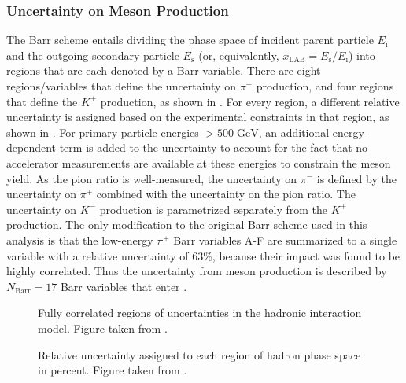 \subsubsection{Uncertainty on Meson Production}
The Barr scheme entails dividing the phase space of incident parent particle $E_\mathrm{i}$ and the outgoing secondary particle $E_\mathrm{s}$ (or, equivalently, $x_{\mathrm{LAB}}=E_\mathrm{s}/E_\mathrm{i}$) into regions that are each denoted by a Barr variable.
There are eight regions/variables that define the uncertainty on $ \pi^+ $ production, and four regions that define the $K^+$ production, as shown in .
For every region, a different relative uncertainty is assigned based on the experimental constraints in that region, as shown in .
For primary particle energies $>500\;\mathrm{GeV}$, an additional energy-dependent term is added to the uncertainty to account for the fact that no accelerator measurements are available at these energies to constrain the meson yield.
As the pion ratio is well-measured, the uncertainty on $ \pi^- $ is defined by the uncertainty on $ \pi^+ $ combined with the uncertainty on the pion ratio.
The uncertainty on $ K^- $ production is parametrized separately from the $K^+$ production.
The only modification to the original Barr scheme used in this analysis is that the low-energy $ \pi^+ $ Barr variables A-F are summarized to a single variable with a relative uncertainty of 63\%, because their impact was found to be highly correlated.
Thus the uncertainty from meson production is described by $N_\mathrm{Barr}=17$ Barr variables that enter .

\begin{figure}
    \centering
    
    \caption{Fully correlated regions of uncertainties in the hadronic interaction model. Figure taken from \cite{Barr2006}.}
\end{figure}
\begin{figure}
    \centering
    
    \caption{Relative uncertainty assigned to each region of hadron phase space in percent. Figure taken from \cite{Barr2006}.}
\end{figure}

